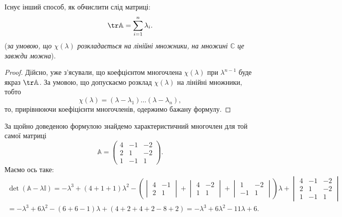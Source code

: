 \documentclass{math_library}
\begin{document}
\begin{corollary}
Існує інший способ, як обчислити слід матриці:
\begin{align*}
\tr \mathbb{A} = \displaystyle\sum_{i=1}^n \lambda_i.
\end{align*}
(\textit{за умовою, що $\chi(\lambda)$ розкладається на лінійні множники, на множині $\mathbb{C}$ це завжди можна}).
\end{corollary}

\begin{proof}
Дійсно, уже з'ясували, що коефцієнтом многочлена $\chi(\lambda)$ при $\lambda^{n-1}$ буде якраз $\tr \mathbb{A}$. За умовою, що допускаємо розклад $\chi(\lambda)$ на лінійні множники, тобто
\[
\chi(\lambda) = (\lambda-\lambda_1) \dots (\lambda - \lambda_n),
\]
то, прирівнюючи коефіцієнти многочленів, одержимо бажану формулу.
\end{proof}

\begin{example}
За щойно доведеною формулою знайдемо характеристичний многочлен для той самої матриці 
\[
\mathbb{A} = \begin{pmatrix}
4 & -1 & -2 \\
2 & 1 & -2 \\
1 & -1 & 1
\end{pmatrix}.
\]
Маємо ось таке:
\begin{align*}
\det (\mathbb{A} - \lambda \mathbb{I}) = -\lambda^3 + (4+1+1)\lambda^2 - \left( \begin{vmatrix}
4 & -1 \\
2 & 1
\end{vmatrix} + \begin{vmatrix}
4 & -2 \\
1 & 1
\end{vmatrix} + \begin{vmatrix}
1 & -2 \\
-1 & 1
\end{vmatrix} \right) \lambda + \begin{vmatrix}
4 & -1 & -2 \\
2 & 1 & -2 \\
1 & -1 & 1
\end{vmatrix} \\
=-\lambda^3 + 6\lambda^2 - (6+6-1)\lambda + (4+2+4+2-8+2) = -\lambda^3 + 6\lambda^2 -11\lambda + 6.
\end{align*}
\end{example}
\end{document}
